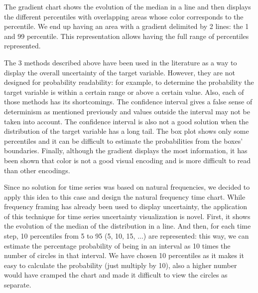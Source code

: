 \documentclass[a4paper,3p,sort&compress]{elsarticle}
\begin{document}
The gradient chart shows the evolution of the median in a line and then displays the different percentiles
with overlapping areas whose color corresponds to the percentile. We end up having an area with a gradient
delimited by 2 lines: the 1 and 99 percentile. This representation allows having the
 full range of percentiles represented.

The 3 methods described above have been used in the literature as a way to display the overall uncertainty
of the target variable. However, they are not designed for probability readability: for example, to determine
the probability the target variable is within a certain range or above a certain value. Also,
each of those methods has its shortcomings. The confidence interval gives a false sense of determinism as mentioned previously
and values outside the interval may not be taken into account. The confidence interval is also not a good solution
when the distribution of the target variable has a long tail. The box plot shows only some percentiles and it can be difficult to
estimate the probabilities from the boxes' boundaries. Finally, although the gradient displays the most information, it has been
shown \cite{cleveland_graphical_1984} that color is not
a good visual encoding and is more difficult to read than other encodings.

Since no solution for time series was based on natural frequencies, we decided to apply this idea to this case
and design the natural frequency time chart.
While frequency framing has already been used to display uncertainty, the application of this technique for time series
uncertainty visualization is novel. First,
it shows the evolution of the median of the distribution in a line. And then, for each time
step, 10 percentiles from 5 to 95 (5, 10, 15, ...) are represented: this way, we can estimate the percentage
probability of being in an interval as 10 times the number of circles in that interval.
We have chosen 10 percentiles as it makes it easy to calculate the probability (just multiply by 10), also a higher number
would have cramped the chart and made it difficult to view the circles as separate.
\end{document}
